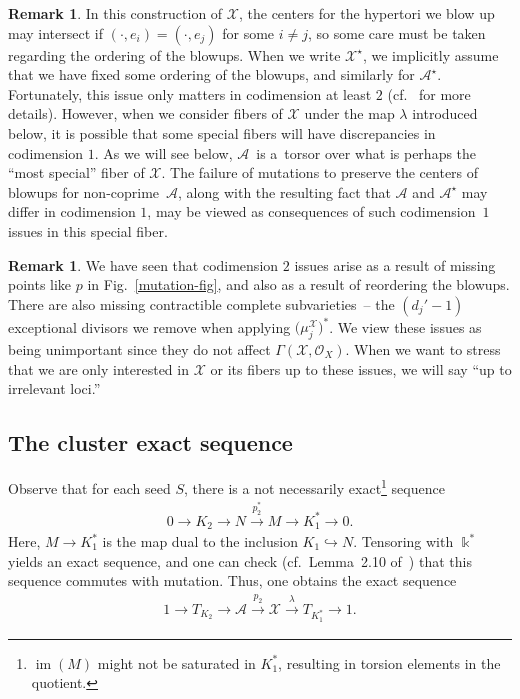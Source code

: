 \documentclass[pdftex]{sigma}
\numberwithin{equation}{section}
\numberwithin{figure}{section}
\numberwithin{table}{section}
\DeclareMathOperator{\im}{im}
\let\rar=\rightarrow
\let\s=\mathcal
\newcommand {\kk} {\Bbbk}
\theoremstyle{definition}
\newtheorem{rmk}[thm]{Remark}
\begin{document}
\begin{rmk}\label{CodimensionOne}In this construction of $\s{X}$, the centers for the hypertori we blow up may intersect if $(\cdot,e_i)=(\cdot,e_j)$ for some $i\neq j$, so some care must be taken regarding the ordering of the blowups. When we write $\s{X}^{\star}$, we implicitly assume that we have fixed some ordering of the blowups, and similarly for $\s{A}^{\star}$. Fortunately, this issue only matters in codimension at least $2$ (cf.~\cite{GHK3} for more details). However, when we consider fibers of $\s{X}$ under the map $\lambda$ introduced below, it is possible that some special fibers will have discrepancies in codimension $1$. As we will see below, $\s{A}$~is a~torsor over what is perhaps the ``most special'' fiber of $\s{X}$. The failure of mutations to preserve the centers of blowups for non-coprime~$\s{A}$, along with the resulting fact that $\s{A}$ and $\s{A}^{\star}$ may differ in codimension $1$, may be viewed as consequences of such codimension~$1$ issues in this special fiber.
\end{rmk}

\begin{rmk}\label{affinization}We have seen that codimension $2$ issues arise as a result of missing points like $p$ in Fig.~\ref{mutation-fig}, and also as a result of reordering the blowups. There are also missing contractible complete subvarieties~-- the $(d_j'-1)$ exceptional divisors we remove when applying $\big(\mu_j^{\s{X}}\big)^*$. We view these issues as being unimportant since they do not affect $\Gamma(\s{X},\s{O}_X)$. When we want to stress that we are only interested in $\s{X}$ or its fibers up to these issues, we will say ``up to irrelevant loci.''
\end{rmk}

\subsection{The cluster exact sequence}\label{cluster exact section}
Observe that for each seed $S$, there is a not necessarily exact\footnote{$\im(M)$ might not be saturated in $K_1^*$, resulting in torsion elements in the quotient.} sequence
\begin{gather*}
	0 \rar K_2 \rar N \stackrel{p_2^*}{\rar} M \rar K_1^* \rar 0.
\end{gather*}
Here, $M\rar K_1^*$ is the map dual to the inclusion $K_1\hookrightarrow N$. Tensoring with $\kk^*$ yields an exact sequence, and one can check (cf.\ Lemma~2.10 of~\cite{FG1}) that this sequence commutes with mutation. Thus, one obtains the exact sequence
\begin{gather*}
	1\rar T_{K_2} \rar \s{A} \stackrel{p_2}{\rar} \s{X} \stackrel{\lambda}{\rar} T_{K_1^*} \rar 1.
\end{gather*}
\end{document}

